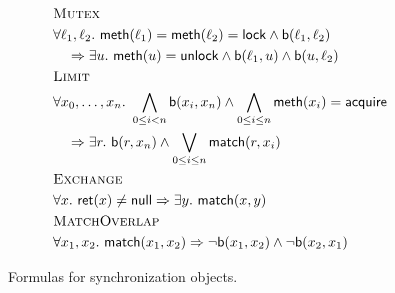 \begin{figure}

  \footnotesize
  \begin{align*}
    & \textsc{Mutex} \\
    & \forall \ell_1, \ell_2.\ {\sf meth}(\ell_1) = {\sf meth}(\ell_2) = {\sf lock} \land {\sf b}(\ell_1,\ell_2) \\
    & \quad \implies \exists u.\ {\sf meth}(u) = {\sf unlock} \land {\sf b}(\ell_1,u) \land {\sf b}(u,\ell_2)
    \\
    & \textsc{Limit} \\
    & \forall x_0,\dots,x_n.\ \bigwedge_{0 \leq i < n} {\sf b}(x_i,x_n) \land \bigwedge_{0 \leq i \leq n} {\sf meth}(x_i) = {\sf acquire} \\
    & \quad \implies \exists r.\ {\sf b}(r,x_n) \land \bigvee_{0 \leq i \leq n} {\sf match}(r,x_i)
    \\
    & \textsc{Exchange} \\
    & \forall x.\ {\sf ret}(x) \neq {\sf null} \implies  \exists y.\ {\sf match}(x,y)  \\
    & \textsc{MatchOverlap} \\
    & \forall x_1,x_2.\ {\sf match}(x_1,x_2) \implies \neg {\sf b}(x_1,x_2) \land \neg {\sf b}(x_2,x_1) 
  \end{align*}

  \caption{Formulas for synchronization objects.}
  \label{fig:formulas:synchronization}

\end{figure}
